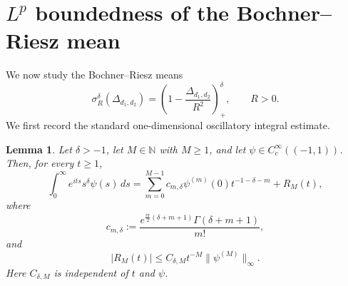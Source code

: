 \documentclass[12pt]{amsart}
\newcommand\Lapd{\Delta_{d_1, d_2}}
\newtheorem{lemma}[theorem]{Lemma}
\begin{document}
\section{ \texorpdfstring{$L^p$}{Lp} boundedness of the Bochner--Riesz mean}\label{sec4}

We now study the Bochner--Riesz means
\begin{equation*}
    \sigma_{R}^\delta(\Lapd) = \left(1-\frac{\Lapd}{R^2}\right)_+^\delta,
\qquad R>0.
\end{equation*}
We first record the standard one-dimensional oscillatory integral estimate.











\begin{lemma}\label{lem:osc-expansion-order-M}
Let $\delta>-1$, let $M\in\mathbb{N}$ with $M\geq 1$, and let
$\psi\in C_c^\infty((-1,1))$. Then, for every $t\geq 1$,
\begin{equation}\label{eq_oscillatory_expansion}
    \int_0^\infty e^{its}s^\delta\psi(s)\,ds
    =
    \sum_{m=0}^{M-1}
    c_{m,\delta}\psi^{(m)}(0)t^{-1-\delta-m}
    +R_M(t),
\end{equation}
where
\begin{equation*}
    c_{m,\delta}
    :=
    \frac{e^{\frac{i\pi}{2}(\delta+m+1)}
    \Gamma(\delta+m+1)}{m!},
\end{equation*}
and
\begin{equation}\label{eq_oscillatory_remainder}
    |R_M(t)|
    \leq
    C_{\delta,M}t^{-M}
    \|\psi^{(M)}\|_\infty .
\end{equation}
Here $C_{\delta,M}$ is independent of $t$ and $\psi$.
\end{lemma}
\end{document}
